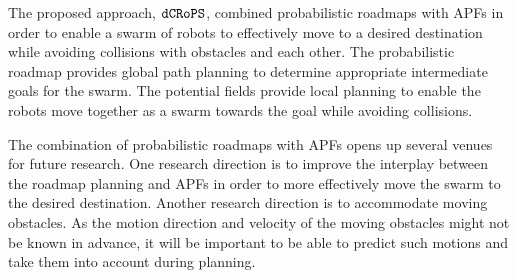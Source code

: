 \documentclass[letterpaper, 10pt, conference]{ieeeconf}
\newcommand{\Acronym}[1]{\ensuremath{{\small{\texttt{#1}}}}}
\newcommand{\Name}{\Acronym{dCRoPS}}
\begin{document}
The proposed approach, $\Name$, combined probabilistic roadmaps with
APFs in order to enable a swarm of robots to effectively move to a
desired destination while avoiding collisions with obstacles and each
other.  The probabilistic roadmap provides global path planning to
determine appropriate intermediate goals for the swarm. The potential
fields provide local planning to enable the robots move together as a
swarm towards the goal while avoiding collisions.

The combination of probabilistic roadmaps with APFs opens up several
venues for future research. One research direction is to improve the
interplay between the roadmap planning and APFs in order to more
effectively move the swarm to the desired destination. Another
research direction is to accommodate moving obstacles. As the motion
direction and velocity of the moving obstacles might not be known in
advance, it will be important to be able to predict such motions
and take them into account during planning.

 

\end{document}

